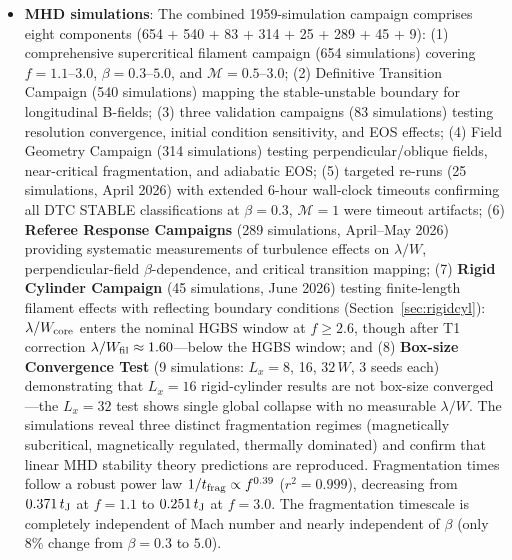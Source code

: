 \documentclass[twoside,twocolumn]{mnras}
\begin{document}
\begin{itemize}
    \item \textbf{MHD simulations}: The combined 1959-simulation campaign comprises eight components (654 + 540 + 83 + 314 + 25 + 289 + 45 + 9): (1) comprehensive supercritical filament campaign (654 simulations) covering $f = 1.1$--$3.0$, $\beta = 0.3$--$5.0$, and $\mathcal{M} = 0.5$--$3.0$; (2) Definitive Transition Campaign (540 simulations) mapping the stable-unstable boundary for longitudinal B-fields; (3) three validation campaigns (83 simulations) testing resolution convergence, initial condition sensitivity, and EOS effects; (4) Field Geometry Campaign (314 simulations) testing perpendicular/oblique fields, near-critical fragmentation, and adiabatic EOS; (5) targeted re-runs (25 simulations, April 2026) with extended 6-hour wall-clock timeouts confirming all DTC STABLE classifications at $\beta = 0.3$, $\mathcal{M} = 1$ were timeout artifacts; (6) \textbf{Referee Response Campaigns} (289 simulations, April--May 2026) providing systematic measurements of turbulence effects on $\lambda/W$, perpendicular-field $\beta$-dependence, and critical transition mapping; (7) \textbf{Rigid Cylinder Campaign} (45 simulations, June 2026) testing finite-length filament effects with reflecting boundary conditions (Section~\ref{sec:rigidcyl}): $\lambda/W_{\rm core}$ enters the nominal HGBS window at $f \geq 2.6$, though after T1 correction $\lambda/W_{\rm fil} \approx 1.60$---below the HGBS window; and (8) \textbf{Box-size Convergence Test} (9 simulations: $L_x = 8$, 16, $32\,W$, 3 seeds each) demonstrating that $L_x = 16$ rigid-cylinder results are not box-size converged---the $L_x = 32$ test shows single global collapse with no measurable $\lambda/W$. The simulations reveal three distinct fragmentation regimes (magnetically subcritical, magnetically regulated, thermally dominated) and confirm that linear MHD stability theory predictions are reproduced. Fragmentation times follow a robust power law $1/t_{\rm frag} \propto f^{0.39}$ ($r^2 = 0.999$), decreasing from $0.371\,t_{\rm J}$ at $f=1.1$ to $0.251\,t_{\rm J}$ at $f=3.0$. The fragmentation timescale is completely independent of Mach number and nearly independent of $\beta$ (only 8\% change from $\beta=0.3$ to $5.0$).


\end{itemize}
\end{document}
